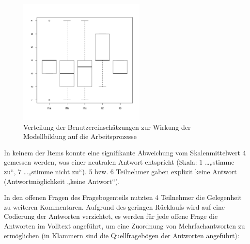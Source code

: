 \begin{figure}[htbp]
	\centering
		\includegraphics[height=2.5in]{img/Evaluierung/wirkung.png}
	\caption{Verteilung der Benutzereinschätzungen zur Wirkung der Modellbildung auf die Arbeitsprozesse}
	\label{fig:img_Evaluierung_wirkung}
\end{figure}

In keinem der Items konnte eine signifikante Abweichung vom Skalenmittelwert 4 gemessen werden, was einer neutralen Antwort entspricht (Skala: 1 \ldots „stimme zu“, 7 \ldots „stimme nicht zu“). 5 bzw. 6 Teilnehmer gaben explizit keine Antwort (Antwortmöglichkeit „keine Antwort“).

In den offenen Fragen des Fragebogenteils nutzten 4 Teilnehmer die Gelegenheit zu weiteren Kommentaren. Aufgrund des geringen Rücklaufs wird auf eine Codierung der Antworten verzichtet, es werden für jede offene Frage die Antworten im Volltext angeführt, um eine Zuordnung von Mehrfachantworten zu ermöglichen (in Klammern sind die Quellfragebögen der Antworten angeführt):

